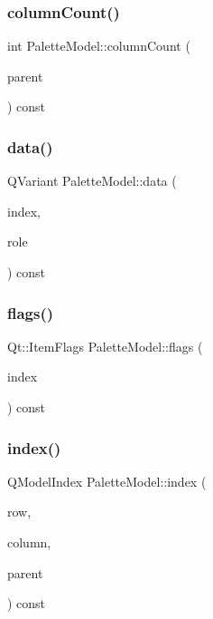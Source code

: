 \subsubsection{\texorpdfstring{columnCount()}{columnCount()}}
{\footnotesize\ttfamily int Palette\+Model\+::column\+Count (\begin{DoxyParamCaption}\item[{const Q\+Model\+Index \&}]{parent }\end{DoxyParamCaption}) const\hspace{0.3cm}{\ttfamily [inline]}}

\mbox{\label{class_palette_model_a44d61df1c8db82dacb531cbc58072759}} 
\subsubsection{\texorpdfstring{data()}{data()}}
{\footnotesize\ttfamily Q\+Variant Palette\+Model\+::data (\begin{DoxyParamCaption}\item[{const Q\+Model\+Index \&}]{index,  }\item[{int}]{role }\end{DoxyParamCaption}) const\hspace{0.3cm}{\ttfamily [inline]}}

\mbox{\label{class_palette_model_abed3f62ed9707fa19887b724344bf705}} 
\subsubsection{\texorpdfstring{flags()}{flags()}}
{\footnotesize\ttfamily Qt\+::\+Item\+Flags Palette\+Model\+::flags (\begin{DoxyParamCaption}\item[{const Q\+Model\+Index \&}]{index }\end{DoxyParamCaption}) const\hspace{0.3cm}{\ttfamily [inline]}}

\mbox{\label{class_palette_model_a193464f0511b7d81c936162dbc613282}} 
\subsubsection{\texorpdfstring{index()}{index()}}
{\footnotesize\ttfamily Q\+Model\+Index Palette\+Model\+::index (\begin{DoxyParamCaption}\item[{int}]{row,  }\item[{int}]{column,  }\item[{const Q\+Model\+Index \&}]{parent }\end{DoxyParamCaption}) const\hspace{0.3cm}{\ttfamily [inline]}}

